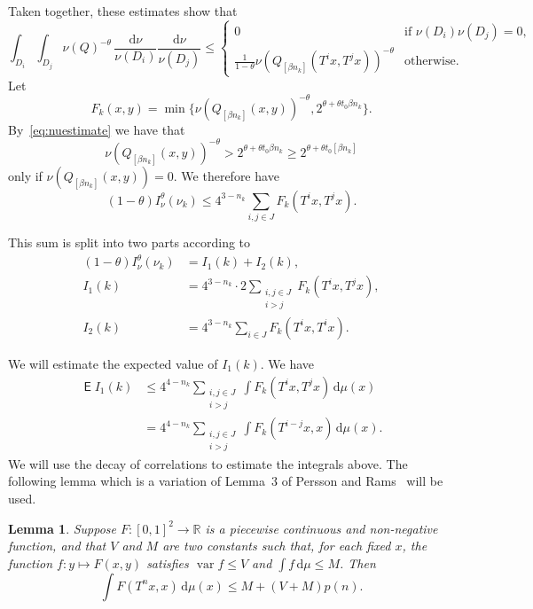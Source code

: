 \documentclass[11pt]{article}
\newtheorem{lemm}[theo]{Lemma}
\theoremstyle{definition}
\numberwithin{equation}{section}
\numberwithin{figure}{section}
\numberwithin{table}{section}
\DeclareMathOperator{\E}{\mathsf{E}}
\DeclareMathOperator{\var}{var}
\newcommand*{\dd}{\mathrm{d}}
\begin{document}
Taken together, these estimates show that
\[
\int_{D_i} \int_{D_j} \nu (Q)^{-\theta} \, \frac{\dd \nu}{\nu (D_i)} \frac{\dd \nu}{\nu (D_j)} \leq
\left\{
\begin{array}{ll} 0 & \text{if } \nu (D_i) \nu (D_j) = 0,
\\ \frac{1}{1-\theta} \nu (Q_{[\beta n_k]} (T^i x, T^j x))^{-\theta} & \text{otherwise}.
\end{array} \right.
\]
Let
\[
F_k (x,y) = \min\{\nu (Q_{[\beta n_k]} (x, y))^{-\theta}, 2^{\theta + \theta t_0 \beta n_k} \}.
\]
By~\eqref{eq:nuestimate} we have that
\[
\nu (Q_{[\beta n_k]} (x, y))^{-\theta} > 2^{\theta + \theta t_0 \beta n_k} \geq 2^{\theta + \theta t_0 [\beta n_k]}
\]
only if $\nu (Q_{[\beta n_k]} (x, y)) = 0$. We therefore have
\[
(1- \theta) I_\nu^\theta (\nu_k) \leq 4^{3-n_k} \sum_{i,j \in J} F_k (T^i x, T^j x).
\]

This sum is split into two parts according to
\begin{align*}
(1 - \theta) I_\nu^\theta (\nu_k) &= I_1 (k) + I_2 (k), \\ I_1 (k) &= 4^{3 - n_k} \cdot 2 \sum_{\substack{i,j \in J \\i>j}} F_k (T^i x, T^j x),
\\ I_2 (k) &= 4^{3 - n_k} \sum_{i \in J} F_k (T^i x, T^i x).
\end{align*}

We will estimate the expected value of $I_1 (k)$. We have
\begin{align*}
\E I_1 (k) & \leq 4^{4-n_k} \sum_{\substack{i,j \in J \\i>j}} \int F_k (T^i x, T^j x) \, \dd \mu (x) \\ &= 4^{4-n_k}
\sum_{\substack{i,j \in J \\ i>j}} \int F_k (T^{i-j} x, x) \,
\dd \mu (x).
\end{align*}
We will use the decay of correlations to estimate the integrals above. The following lemma which is a variation of Lemma~3 of Persson and Rams~\cite{perssonrams} will be used.

\begin{lemm}\label{lem:perssonrams}
Suppose $F \colon [0,1]^2 \to \mathbb{R}$ is a piecewise continuous and non-negative function, and that $V$ and $M$ are two constants such that, for each fixed $x$, the function $f \colon y \mapsto F(x,y)$ satisfies $\var f \leq V$ and $\int f \, \dd\mu \leq M$. Then
\[
\int F(T^n x, x) \, \dd\mu (x) \leq M + (V + M) p (n).
\]
\end{lemm}
\end{document}

